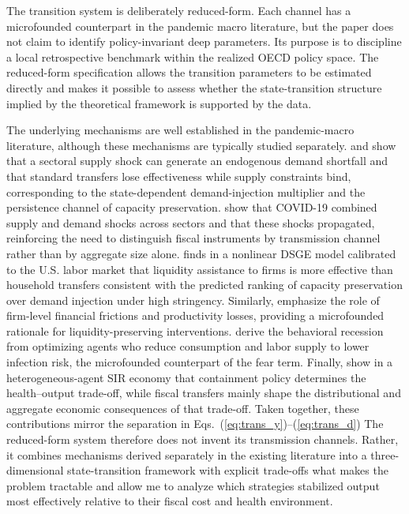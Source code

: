 \documentclass[12pt, a4paper]{article}
\begin{document}
\noindent 

The transition system is deliberately reduced-form. Each channel has a microfounded counterpart in the pandemic macro literature, but the paper does not claim to identify policy-invariant deep parameters. Its purpose is to discipline a local retrospective benchmark within the realized OECD policy space. The reduced-form specification allows the transition parameters to be estimated directly and makes it possible to assess whether the state-transition structure implied by the theoretical framework is supported by the data.

The underlying mechanisms are well established in the pandemic-macro literature, although these mechanisms are typically studied separately. \citet{guerrieri2022} and \citet{bayer2023c} show that a sectoral supply shock can generate an endogenous demand shortfall and that standard transfers lose effectiveness while supply constraints bind, corresponding to the state-dependent demand-injection multiplier and the persistence channel of capacity preservation. \citet{BaqaeeFarhi2022} show that COVID-19 combined supply and demand shocks across sectors and that these shocks propagated, reinforcing the need to distinguish fiscal instruments by transmission channel rather than by aggregate size alone. \citet{fariaecastro2021} finds in a nonlinear DSGE model calibrated to the U.S. labor market that liquidity assistance to firms is more effective than household transfers consistent with the predicted ranking of capacity preservation over demand injection under high stringency. Similarly, \citet{CespedesChangVelasco2022} emphasize the role of firm-level financial frictions and productivity losses, providing a microfounded rationale for liquidity-preserving interventions. \citet{eichenbaum2021macro} derive the behavioral recession from optimizing agents who reduce consumption and labor supply to lower infection risk, the microfounded counterpart of the fear term. Finally, \citet{KaplanMollViolante2020} show in a heterogeneous-agent SIR economy that containment policy determines the health--output trade-off, while fiscal transfers mainly shape the distributional and aggregate economic consequences of that trade-off. Taken together, these contributions mirror the separation in Eqs.~(\ref{eq:trans_y})--(\ref{eq:trans_d})  The reduced-form system therefore does not invent its transmission channels. Rather, it combines mechanisms derived separately in the existing literature into a three-dimensional state-transition framework with explicit trade-offs what makes the problem tractable and allow me to analyze which strategies stabilized output most effectively relative to their fiscal cost and health environment.
\end{document}
